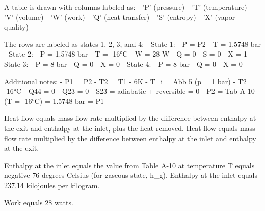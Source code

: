 A table is drawn with columns labeled as:  
- 'P' (pressure)  
- 'T' (temperature)  
- 'V' (volume)  
- 'W' (work)  
- 'Q' (heat transfer)  
- 'S' (entropy)  
- 'X' (vapor quality)  

The rows are labeled as states 1, 2, 3, and 4:  
- State 1:  
  - P = P2  
  - T = 1.5748 bar  
- State 2:  
  - P = 1.5748 bar  
  - T = -16°C  
  - W = 28 W  
  - Q = 0  
  - S = 0  
  - X = 1  
- State 3:  
  - P = 8 bar  
  - Q = 0  
  - X = 0  
- State 4:  
  - P = 8 bar  
  - Q = 0  
  - X = 0  

Additional notes:  
- P1 = P2  
- T2 = T1 - 6K  
- T_i = Abb 5 (p = 1 bar)  
- T2 = -16°C  
- Q44 = 0  
- Q23 = 0  
- S23 = adiabatic + reversible = 0  
- P2 = Tab A-10 (T = -16°C) = 1.5748 bar = P1

Heat flow equals mass flow rate multiplied by the difference between enthalpy at the exit and enthalpy at the inlet, plus the heat removed.  
Heat flow equals mass flow rate multiplied by the difference between enthalpy at the inlet and enthalpy at the exit.

Enthalpy at the inlet equals the value from Table A-10 at temperature T equals negative 76 degrees Celsius (for gaseous state, h_g).  
Enthalpy at the inlet equals 237.14 kilojoules per kilogram.

Work equals 28 watts.